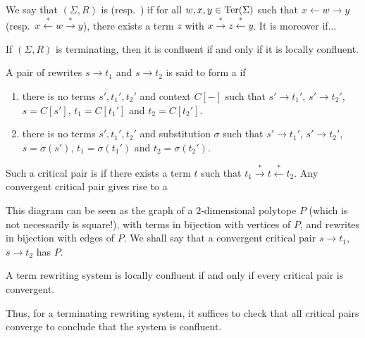 We say that $(\Sigma,R)$ is  (resp.\ ) if for all $w,x,y \in \operatorname{Ter}(\Sigma)$ such that $x \leftarrow w \to y$ (resp.\ $x \overset{*}{\leftarrow} w \overset{*}{\to} y$), there exists a term $z$ with $x \overset{*}{\to} z \overset{*}{\leftarrow} y$.
It is moreover  if...

\begin{lemma}
  \label{thm:Newman}
  If $(\Sigma,R)$ is terminating, then it is confluent if and only if it is locally confluent.
\end{lemma}

A pair of rewrites $s \to t_1$ and $s\to t_2$ is said to form a  if 
\begin{enumerate}
  \item there is no terms $s',t_1',t_2'$ and context $C[-]$ such that $s' \to t_1'$, $s' \to t_2'$, $s=C[s']$, $t_1=C[t_1']$ and $t_2=C[t_2']$.
  \item there is no terms $s',t_1',t_2'$ and substitution $\sigma$ such that $s' \to t_1'$, $s' \to t_2'$, $s=\sigma(s')$, $t_1=\sigma(t_1')$ and $t_2=\sigma(t_2')$.
\end{enumerate}
Such a critical pair is  if there exists a term $t$ such that $t_1 \overset{*}{\to} t \overset{*}{\leftarrow} t_2$. 
Any convergent critical pair gives rise to a 
\begin{center}
\end{center}
This diagram can be seen as the graph of a $2$-dimensional polytope $P$ (which is not necessarily is square!), with terms in bijection with vertices of $P$, and rewrites in bijection with edges of $P$.
We shall say that a convergent critical pair $s \to t_1$, $s\to t_2$ has  $P$.


\begin{lemma}
  \label{l:local-confluence-critical-pair}
  A term rewriting system is locally confluent if and only if every critical pair is convergent. 
\end{lemma}

Thus, for a terminating rewriting system, it suffices to check that all critical pairs converge to conclude that the system is confluent. 

